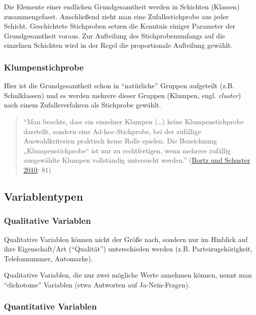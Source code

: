 \documentclass[
  11pt,
  ngerman,
  a4paper,
]{report}
\begin{document}
Die Elemente einer endlichen Grundgesamtheit werden in Schichten (Klassen) zusammengefasst. Anschließend zieht man eine Zufallsstichprobe aus jeder Schicht. Geschichtete Stichproben setzen die Kenntnis einiger Parameter der Grundgesamtheit voraus. Zur Aufteilung des Stichprobenumfangs auf die einzelnen Schichten wird in der Regel die proportionale Aufteilung gewählt.

\hypertarget{klumpenstichprobe}{%
\subsubsection{Klumpenstichprobe}\label{klumpenstichprobe}}

Hier ist die Grundgesamtheit schon in \enquote{natürliche} Gruppen aufgeteilt (z.B. Schulklassen) und es werden mehrere dieser Gruppen (Klumpen, engl. \emph{cluster}) nach einem Zufallsverfahren als Stichprobe gewählt.

\begin{quote}
\enquote{Man beachte, dass ein einzelner Klumpen (\ldots) keine Klumpenstichprobe darstellt, sondern eine Ad-hoc-Stichprobe, bei der zufällige Auswahlkriterien praktisch keine Rolle spielen. Die Bezeichnung „Klumpenstichprobe`` ist nur zu rechtfertigen, wenn mehrere zufällig ausgewählte Klumpen vollständig untersucht werden.} (\protect\hyperlink{ref-bortz}{Bortz und Schuster 2010}: 81)
\end{quote}

\hypertarget{variablentypen}{%
\subsection{Variablentypen}\label{variablentypen}}

\hypertarget{qualitative-variablen}{%
\subsubsection{Qualitative Variablen}\label{qualitative-variablen}}

Qualitative Variablen können nicht der Größe nach, sondern nur im Hinblick auf ihre Eigenschaft/Art (\enquote{Qualität}) unterschieden werden (z.B. Parteizugehörigkeit, Telefonnummer, Automarke).

Qualitative Variablen, die nur zwei mögliche Werte annehmen können, nennt man \enquote{dichotome} Variablen (etwa Antworten auf Ja-Nein-Fragen).

\hypertarget{quantitative-variablen}{%
\subsubsection{Quantitative Variablen}\label{quantitative-variablen}}
\end{document}
